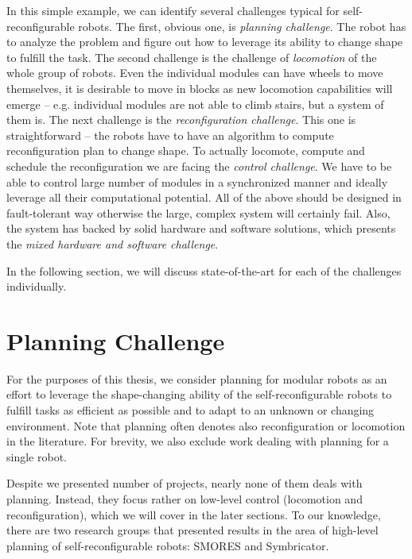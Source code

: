 In this simple example, we can identify several challenges typical for
self-reconfigurable robots. The first, obvious one, is \emph{planning
challenge}. The robot has to analyze the problem and figure out how to leverage
its ability to change shape to fulfill the task. The second challenge is the
challenge of \emph{locomotion} of the whole group of robots. Even the individual
modules can have wheels to move themselves, it is desirable to move in blocks as
new locomotion capabilities will emerge -- e.g. individual modules are not able
to climb stairs, but a system of them is. The next challenge is the
\emph{reconfiguration challenge}. This one is straightforward -- the robots have
to have an algorithm to compute reconfiguration plan to change shape. To
actually locomote, compute and schedule the reconfiguration we are facing the
\emph{control challenge}. We have to be able to control large number of modules
in a synchronized manner and ideally leverage all their computational potential.
All of the above should be designed in fault-tolerant way otherwise the large,
complex system will certainly fail. Also, the system has backed by solid
hardware and software solutions, which presents the \emph{mixed hardware and
software challenge}.

In the following section, we will discuss state-of-the-art for each of the
challenges individually.

\section{Planning Challenge}

For the purposes of this thesis, we consider planning for modular robots as an
effort to leverage the shape-changing ability of the self-reconfigurable robots
to fulfill tasks as efficient as possible and to adapt to an unknown or changing
environment. Note that planning often denotes also reconfiguration or locomotion
in the literature. For brevity, we also exclude work dealing with planning for a
single robot.

Despite we presented number of projects, nearly none of them deals with
planning. Instead, they focus rather on low-level control (locomotion and
reconfiguration), which we will cover in the later sections. To our knowledge,
there are two research groups that presented results in the area of high-level
planning of self-reconfigurable robots: SMORES and Symbricator.


